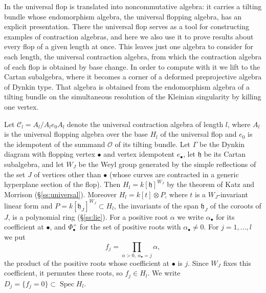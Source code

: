 \documentclass[11pt]{amsart}
\makeatletter
\numberwithin{table}{section}
\numberwithin{figure}{section}
\numberwithin{equation}{section}
\theoremstyle{definition}
\theoremstyle{plain}
\newcommand{\cC}{\mathcal{C}}
\newcommand{\cO}{\mathcal{O}}
\newcommand{\h}{\mathfrak{h}}
\newcommand{\bul}{\bullet}
\DeclareMathOperator{\Spec}{Spec}
\renewcommand\paragraph{\@startsection{paragraph}{4}{\z@}{\medskipamount}{-.5em}{\normalfont\bfseries}}
\makeatother
\begin{document}
In \cite{K} the universal flop is translated into noncommutative algebra: it carries a tilting bundle whose endomorphism algebra, the universal flopping algebra, has an explicit presentation. There the universal flop serves as a tool for constructing examples of contraction algebras, and here we also use it to prove results about every flop of a given length at once. This leaves just one algebra to consider for each length, the universal contraction algebra, from which the contraction algebra of each flop is obtained by base change. In order to compute with it we lift to the Cartan subalgebra, where it becomes a corner of a deformed preprojective algebra of Dynkin type. That algebra is obtained from the endomorphism algebra of a tilting bundle on the simultaneous resolution of the Kleinian singularity by killing one vertex.

\paragraph{The universal setting.} Let $\cC_l = A_l/A_l e_0 A_l$ denote the universal contraction algebra of length $l$, where $A_l$ is the universal flopping algebra over the base $H_l$ of the universal flop and $e_0$ is the idempotent of the summand $\cO$ of its tilting bundle. Let $\Gamma$ be the Dynkin diagram with flopping vertex $\bul$ and vertex idempotent $e_\bul$, let $\h$ be its Cartan subalgebra, and let $W_J$ be the Weyl group generated by the simple reflections of the set $J$ of vertices other than $\bul$ (whose curves are contracted in a generic hyperplane section of the flop). Then $H_l = k[\h]^{W_J}$ by the theorem of Katz and Morrison (\S\ref{ss:universal}). Moreover $H_l = k[t] \otimes P$, where $t$ is a $W_J$-invariant linear form and $P = k[\h_J]^{W_J} \subset H_l$, the invariants of the span $\h_J$ of the coroots of $J$, is a polynomial ring (\S\ref{ss:lie}). For a positive root $\alpha$ we write $\alpha_\bul$ for its coefficient at $\bul$, and $\Phi^+_\bul$ for the set of positive roots with $\alpha_\bul \neq 0$. For $j = 1, \dots, l$ we put
\[
f_j = \prod_{\alpha > 0,\ \alpha_\bul = j} \alpha ,
\]
the product of the positive roots whose coefficient at $\bul$ is $j$. Since $W_J$ fixes this coefficient, it permutes these roots, so $f_j \in H_l$. We write $D_j = \{f_j = 0\} \subset \Spec H_l$.
\end{document}
